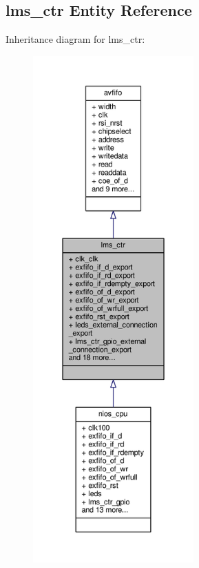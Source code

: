 \subsection{lms\+\_\+ctr Entity Reference}
\label{classlms__ctr}


Inheritance diagram for lms\+\_\+ctr\+:\nopagebreak
\begin{figure}[H]
\begin{center}
\leavevmode
\includegraphics[height=550pt]{d2/d7a/classlms__ctr__inherit__graph}
\end{center}
\end{figure}


